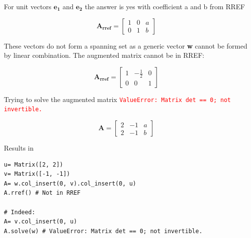 For unit vectors $\mathbf{e_1}$ and $\mathbf{e_2}$ the answer is yes with
coefficient a and b from RREF

$$
\mathbf{A_{rref}} = \left[\begin{matrix}1 & 0 & a\\0 & 1 & b\end{matrix}\right]
$$

These vectors do not form a spanning set as a generic vector \textbf{w} cannot be formed
by linear combination. The augmented matrix cannot be in RREF:

$$
\mathbf{A_{rref}} = \left[\begin{matrix}1 & - \frac{1}{2} & 0\\0 & 0 & 1\end{matrix}\right]
$$

Trying to solve the augmented matrix \textcolor{red}{\texttt{ValueError: Matrix det == 0; not invertible.}}

$$
\mathbf{A} = \left[\begin{matrix}2 & -1 & a\\2 & -1 & b\end{matrix}\right]
$$

Results in 

\begin{verbatim}
u= Matrix([2, 2])
v= Matrix([-1, -1])
A= w.col_insert(0, v).col_insert(0, u)
A.rref() # Not in RREF

# Indeed:
A= v.col_insert(0, u)
A.solve(w) # ValueError: Matrix det == 0; not invertible.
\end{verbatim}

